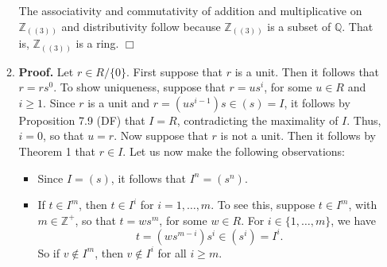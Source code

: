 \documentclass[9pt]{article}
\newcommand{\qed}{\hfill \ensuremath{\Box}}
\newcommand{\Z}{\mathbb{Z}}
\newcommand{\Q}{\mathbb{Q}}
\begin{document}
\begin{enumerate}
\begin{enumerate}
               The associativity and commutativity of addition and
               multiplicative on $\Z_{((3))}$ and distributivity follow because
               $\Z_{((3))}$ is a subset of $\Q$. That is,
               $\Z_{((3))}$ is a ring. \qed        
         \item \textbf{Proof.} Let $r \in R/\{0\}$. First suppose that $r$ is a
               unit. Then it follows that $r = rs^0$. To show uniqueness,
               suppose that $r = us^i$, for some $u \in R$ and $i \ge 1$. Since
               $r$ is a unit and $r = (us^{i-1})s \in (s) = I$, it follows by
               Proposition 7.9 (DF) that $I = R$, contradicting the maximality
               of $I$. Thus, $i = 0$, so that $u = r$. Now suppose that $r$ is
               not a unit. Then it follows by Theorem 1 that $r \in I$. Let us
               now make the following observations:
               \begin{itemize}
                  \item Since $I = (s)$, it follows that $I^n = (s^n)$.
                  \item If $t \in I^m$, then $t \in I^i$ for $i = 1, \ldots, m$.
                        To see this, suppose $t \in I^m$, with $m \in \Z^+$, so
                        that $t = ws^m$, for some $w \in R$. For
                        $i \in \{1, \ldots, m\}$, we have
                        $$t = (ws^{m-i})s^i \in (s^i) = I^i.$$
                        So if $v \notin I^m$, then $v \notin I^i$ for all
                        $i \ge m$.
               \end{itemize}


\end{enumerate}
\end{enumerate}
\end{document}
